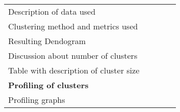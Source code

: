 \begin{table}[H]
\begin{tabular}{@{}l|c|c|c|c@{}}
Description of data used                        &\x  &    & \X &    \\
Clustering method and metrics used              & \X &\x  &    &    \\
Resulting Dendogram                             &    &    &\X  &\x  \\
Discussion about number of clusters             &\x  &\X  &    &    \\
Table with description of cluster size          &\x  &    &\X  &    \\ \midrule
\textbf{Profiling of clusters}                  &    &    &    &    \\
Profiling graphs                                &    &    &\X  &\x  \\
\end{tabular}
\end{table}
